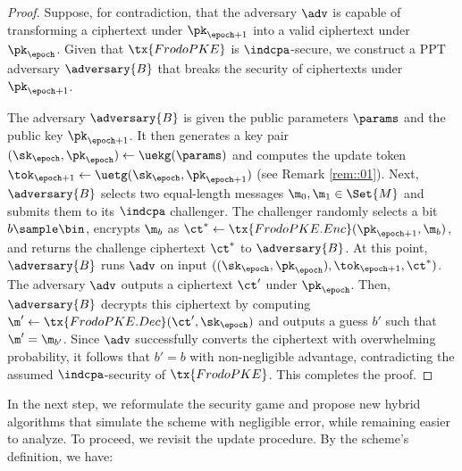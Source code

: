 \documentclass{fundam}
\begin{document}
\begin{proof}
Suppose, for contradiction, that the adversary $\adv$ is capable of transforming a ciphertext under $\pk_{\epoch+1}$ into a valid ciphertext under $\pk_{\epoch}$. Given that $\tx{FrodoPKE}$ is $\indcpa$-secure, we construct a PPT adversary $\adversary{B}$ that breaks the security of ciphertexts under $\pk_{\epoch+1}$.  

The adversary $\adversary{B}$ is given the public parameters $\params$ and the public key $\pk_{\epoch+1}$. It then generates a key pair $(\sk_{\epoch}, \pk_{\epoch})\gets \uekg(\params)$ and computes the update token $\tok_{\epoch+1}\gets\uetg(\sk_{\epoch},\pk_{\epoch+1})$ (see Remark \ref{rem::01}).
Next, $\adversary{B}$ selects two equal-length messages $\m_{0}, \m_{1}\in\Set{M}$ and submits them to its $\indcpa$ challenger.
The challenger randomly selects a bit $b \sample \bin$, encrypts $\m_b$ as $\ct^* \gets \tx{FrodoPKE.Enc}(\pk_{\epoch+1}, \m_b)$, and returns the challenge ciphertext $\ct^*$ to $\adversary{B}$. At this point, $\adversary{B}$ runs $\adv$ on input $((\sk_{\epoch},\pk_{\epoch}),\tok_{\epoch+1}, \ct^{*})$. 
%
The adversary $\adv$ outputs a ciphertext $\ct'$ under $\pk_{\epoch}$. Then, $\adversary{B}$ decrypts this ciphertext by computing $\m'\gets \tx{FrodoPKE.Dec}(\ct', \sk_{\epoch})$ and outputs a guess $b'$ such that $\m' = \m_{b'}$. Since $\adv$ successfully converts the ciphertext with overwhelming probability, it follows that $b' = b$ with non-negligible advantage, contradicting the assumed $\indcpa$-security of $\tx{FrodoPKE}$. This completes the proof.
\end{proof}	

In the next step, we reformulate the security game and propose new hybrid algorithms that simulate the scheme with negligible error, while remaining easier to analyze. To proceed, we revisit the update procedure. By the scheme’s definition, we have:
\end{document}
